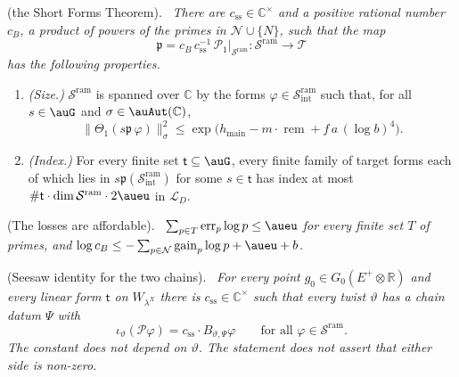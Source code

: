 \documentclass[10pt]{amsart}
\theoremstyle{definition}
\theoremstyle{remark}
\newcommand{\C}{\mathbb C}
\newcommand{\R}{\mathbb R}
\providecommand{\auLat}{\mathcal L}
\providecommand{\auP}{\mathcal P}
\providecommand{\auSram}{\mathcal S^{\mathrm{ram}}}
\providecommand{\auT}{\mathcal T}
\providecommand{\aucB}{c_B}
\providecommand{\auerr}{\operatorname{err}}
\providecommand{\augain}{\operatorname{gain}}
\providecommand{\auhmain}{h_{\mathrm{main}}}
\providecommand{\aupp}{\mathfrak p}
\providecommand{\aurem}{\operatorname{rem}}
\newenvironment{quotedthm}[2]{\par\medskip\noindent\begingroup
  \textbf{#1}#2.\ \itshape\ignorespaces}{\endgroup\par\medskip}
\begin{document}
\begin{quotedthm}{\cite[Theorem~14.13]{P46}}{ (the Short Forms Theorem)}
There are $c_{\mathrm{ss}}\in\C^\times$ and a positive rational number $\aucB$, a product of
powers of the primes in $\mathcal N\cup\{N\}$, such that the map
\[
\aupp=\aucB\,c_{\mathrm{ss}}^{-1}\,\auP_1|_{\auSram}\colon\auSram\to\auT
\]
has the following properties.
\begin{enumerate}
\item[(a)] \emph{(Size.)} $\auSram$ is spanned over $\C$ by the forms
$\varphi\in\auSram_{\mathrm{int}}$ such that, for all $s\in\auG$ and $\sigma\in\auAut(\C)$,
\[
\|\Theta_1(s\aupp\,\varphi)\|_\sigma^2\le\exp\bigl(\auhmain-m\cdot\aurem+f\,a\,(\log b)^4\bigr).
\]
\item[(b)] \emph{(Index.)} For every finite set $\mathsf t\subseteq\auG$, every finite family of
target forms each of which lies in $s\aupp(\auSram_{\mathrm{int}})$ for some $s\in\mathsf t$ has
index at most $\#\mathsf t\cdot\dim\auSram\cdot2\aueu$ in $\auLat_D$.
\end{enumerate}
\end{quotedthm}

\begin{quotedthm}{\cite[Lemma~14.18]{P46}}{ (The losses are affordable)}
$\sum_{p\in T}\auerr_p\log p\le\aueu$ for every finite set $T$ of primes, and
$\log\aucB\le-\sum_{p\in\mathcal N}\augain_p\log p+\aueu+b$.
\end{quotedthm}

\begin{quotedthm}{\cite[Proposition~14.19]{P46}}{ (Seesaw identity for the two chains)}
For every point $g_0\in G_0(E^+\otimes\R)$ and every linear form $\mathsf t$ on $W_{\lambda^X}$
there is $c_{\mathrm{ss}}\in\C^\times$ such that every twist $\vartheta$ has a chain datum $\Psi$
with
\[
\iota_\vartheta(\auP\varphi)=c_{\mathrm{ss}}\cdot B_{\vartheta,\Psi}\varphi\qquad\text{for all }
\varphi\in\auSram .
\]
The constant does not depend on $\vartheta$. The statement does not assert that either side is
non-zero.
\end{quotedthm}
\end{document}
